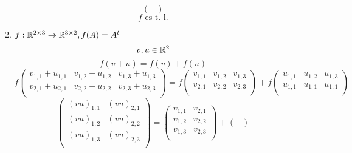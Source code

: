 \documentclass[../practica.root.tex]{subfiles}
\begin{document}
\begin{enumerate}
\begin{enumerate}
\[\begin{pmatrix}
                        \end{pmatrix}
                    \]
                    \[ \boxed{f \text{ es t. l.}} \]
              \item \( f: \mathbb{R}^{2\times3} \to \mathbb{R}^{3\times2}, f(A) = A^t \)
                    \[ v, u \in \mathbb{R}^2 \]
                    \[ f(v + u) = f(v) + f(u) \]
                    \[
                        f
                        \begin{pmatrix}
                            v_{1,1} + u_{1,1} & v_{1,2} + u_{1,2} & v_{1,3} + u_{1,3} \\
                            v_{2,1} + u_{2,1} & v_{2,2} + u_{2,2} & v_{2,3} + u_{2,3} \\
                        \end{pmatrix}
                        =
                        f
                        \begin{pmatrix}
                            v_{1,1} & v_{1,2} & v_{1,3} \\
                            v_{2,1} & v_{2,2} & v_{2,3} \\
                        \end{pmatrix}
                        +
                        f
                        \begin{pmatrix}
                            u_{1,1} & u_{1,2} & u_{1,3} \\
                            u_{1,1} & u_{1,1} & u_{1,1} \\
                        \end{pmatrix}
                    \] \[
                        \begin{pmatrix}
                            (vu)_{1,1} & (vu)_{2,1} \\
                            (vu)_{1,2} & (vu)_{2,2} \\
                            (vu)_{1,3} & (vu)_{2,3} \\
                        \end{pmatrix}
                        =
                        \begin{pmatrix}
                            v_{1,1} & v_{2,1} \\
                            v_{1,2} & v_{2,2} \\
                            v_{1,3} & v_{2,3} \\
                        \end{pmatrix}
                        +
                        \begin{pmatrix}

\end{pmatrix}\]
\end{enumerate}
\end{enumerate}
\end{document}
